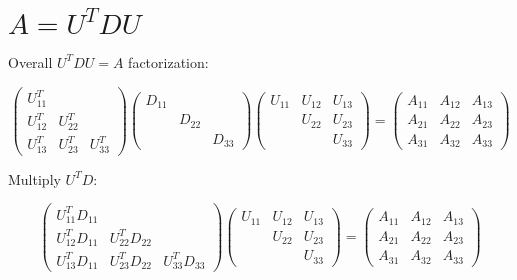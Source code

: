 \documentclass[12pt]{article}
\begin{document}
\section{$A = U^TDU$}

Overall $U^TDU = A$ factorization:

\begin{equation*}
\begin{pmatrix}
U_{11}^T &         &        \\
U_{12}^T & U_{22}^T &        \\
U_{13}^T & U_{23}^T & U_{33}^T
\end{pmatrix}
\begin{pmatrix}
D_{11} &        &        \\
       & D_{22} &        \\
       &        & D_{33}
\end{pmatrix}
\begin{pmatrix}
U_{11} & U_{12} & U_{13} \\
       & U_{22} & U_{23} \\
       &        & U_{33}
\end{pmatrix}
= 
\begin{pmatrix}
A_{11} & A_{12} & A_{13} \\
A_{21} & A_{22} & A_{23} \\
A_{31} & A_{32} & A_{33}
\end{pmatrix}
\end{equation*}

Multiply $U^TD$:

\begin{equation*}
\begin{pmatrix}
U_{11}^TD_{11} &               &              \\
U_{12}^TD_{11} & U_{22}^TD_{22} &              \\
U_{13}^TD_{11} & U_{23}^TD_{22} & U_{33}^TD_{33}
\end{pmatrix}
\begin{pmatrix}
U_{11} & U_{12} & U_{13} \\
       & U_{22} & U_{23} \\
       &        & U_{33}
\end{pmatrix}
= 
\begin{pmatrix}
A_{11} & A_{12} & A_{13} \\
A_{21} & A_{22} & A_{23} \\
A_{31} & A_{32} & A_{33}
\end{pmatrix}
\end{equation*}
\end{document}
